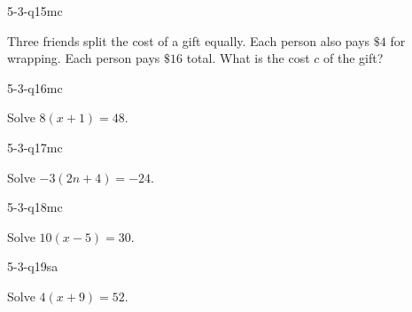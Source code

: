 \begin{practiceQuestion}{5-3-q15}{mc}
\begin{questionText}
Three friends split the cost of a gift equally. Each person also pays $\$4$ for wrapping. Each person pays $\$16$ total. What is the cost $c$ of the gift?
\end{questionText}
\end{practiceQuestion}

\begin{practiceQuestion}{5-3-q16}{mc}
\begin{questionText}
Solve $8(x + 1) = 48$.
\end{questionText}
\end{practiceQuestion}

\begin{practiceQuestion}{5-3-q17}{mc}
\begin{questionText}
Solve $-3(2n + 4) = -24$.
\end{questionText}
\end{practiceQuestion}

\begin{practiceQuestion}{5-3-q18}{mc}
\begin{questionText}
Solve $10(x - 5) = 30$.
\end{questionText}
\end{practiceQuestion}


\begin{practiceQuestion}{5-3-q19}{sa}
\begin{questionText}
Solve $4(x + 9) = 52$.
\end{questionText}
\end{practiceQuestion}

